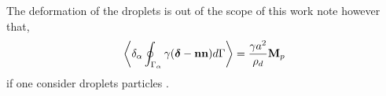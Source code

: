 The deformation of the droplets is out of the scope of this work note however that, 
\begin{equation*}
    \left<\delta_\alpha \oint_{\Gamma_\alpha} \gamma (\bm\delta - \textbf{nn}) d\Gamma\right>
    = 
    \frac{\gamma a^2}{\rho_d} \textbf{M}_p
\end{equation*}
if one consider droplets particles \citep{lhuillier1987phenomenology}. 


